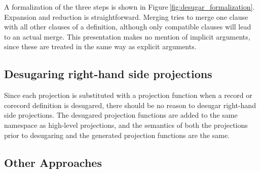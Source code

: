 A formalization of the three steps is shown in Figure\,\ref{fig:desugar_formalization}. Expansion and reduction is straightforward. Merging tries to merge one clause with all other clauses of a definition, although only compatible clauses will lead to an actual merge. This presentation makes no mention of implicit arguments, since these are treated in the same way as explicit arguments.




\subsection{Desugaring right-hand side projections}
Since each projection is substituted with a projection function when a record or corecord definition is desugared, there should be no reason to desugar right-hand side projections. The desugared projection functions are added to the same namespace as high-level projections, and the semantics of both the projections prior to desugaring and the generated projection functions are the same.

\subsection{Other Approaches}

